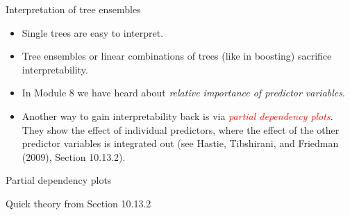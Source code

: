 \documentclass[
  10pt,
  ignorenonframetext,
]{beamer}
\providecommand{\tightlist}{%
  \setlength{\itemsep}{0pt}\setlength{\parskip}{0pt}}
\begin{document}
\begin{frame}{Interpretation of tree ensembles}
\protect\hypertarget{interpretation-of-tree-ensembles}{}
\(~\)

\begin{itemize}
\tightlist
\item
  Single trees are easy to interpret.
\end{itemize}

\vspace{2mm}

\begin{itemize}
\tightlist
\item
  Tree ensembles or linear combinations of trees (like in boosting)
  sacrifice interpretability.
\end{itemize}

\vspace{2mm}

\begin{itemize}
\tightlist
\item
  In Module 8 we have heard about \emph{relative importance of predictor
  variables}.
\end{itemize}

\vspace{2mm}

\begin{itemize}
\tightlist
\item
  Another way to gain interpretability back is via
  \emph{\textcolor{red}{partial dependency plots}}. They show the effect
  of individual predictors, where the effect of the other predictor
  variables is integrated out (see Hastie, Tibshirani, and Friedman
  (2009), Section 10.13.2).
\end{itemize}
\end{frame}

\begin{frame}
\begin{block}{Partial dependency plots}
\protect\hypertarget{partial-dependency-plots}{}
\(~\)

Quick theory from Section 10.13.2
\end{block}
\end{frame}
\end{document}
